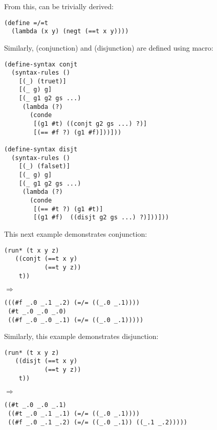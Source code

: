 From this,  can be trivially derived:
\begin{lstlisting}
(define =/=t
  (lambda (x y) (negt (==t x y))))
\end{lstlisting}

Similarly,  (conjunction) and  (disjunction) are defined using macro:
\begin{lstlisting}
(define-syntax conjt
  (syntax-rules ()
    [(_) (truet)]
    [(_ g) g]
    [(_ g1 g2 gs ...)
     (lambda (?)
       (conde
        [(g1 #t) ((conjt g2 gs ...) ?)]
        [(== #f ?) (g1 #f)]))]))

(define-syntax disjt
  (syntax-rules ()
    [(_) (falset)]
    [(_ g) g]
    [(_ g1 g2 gs ...)
     (lambda (?)
       (conde
        [(== #t ?) (g1 #t)]
        [(g1 #f)  ((disjt g2 gs ...) ?)]))]))
\end{lstlisting}

This next example demonstrates conjunction:
\begin{lstlisting}
(run* (t x y z)
   ((conjt (==t x y)
           (==t y z))
    t))
\end{lstlisting}
$\Rightarrow$
\begin{lstlisting}
(((#f _.0 _.1 _.2) (=/= ((_.0 _.1))))
 (#t _.0 _.0 _.0)
 ((#f _.0 _.0 _.1) (=/= ((_.0 _.1)))))
\end{lstlisting}

Similarly, this example demonstrates disjunction:
\begin{lstlisting}
(run* (t x y z)
   ((disjt (==t x y)
           (==t y z))
    t))
\end{lstlisting}
$\Rightarrow$
\begin{lstlisting}
((#t _.0 _.0 _.1)
 ((#t _.0 _.1 _.1) (=/= ((_.0 _.1))))
 ((#f _.0 _.1 _.2) (=/= ((_.0 _.1)) ((_.1 _.2)))))
\end{lstlisting}

